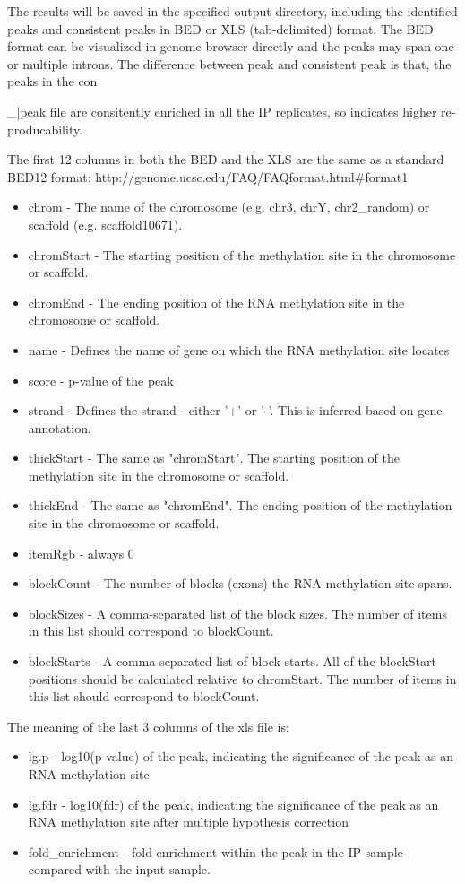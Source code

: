\documentclass[]{article}
\begin{document}
The results will be saved in the specified output directory, including the identified peaks and consistent peaks in BED or XLS (tab-delimited) format. The BED format can be visualized in genome browser directly and the peaks may span one or multiple introns. The difference between peak and consistent peak is that, the peaks in the con{\_|peak file are consitently enriched in all the IP replicates, so indicates higher re-producability.

The first 12 columns in both the BED and the XLS are the same as a standard BED12 format: http://genome.ucsc.edu/FAQ/FAQformat.html{\#}format1
\begin{itemize}
  \item chrom - The name of the chromosome (e.g. chr3, chrY, chr2{\_}random) or scaffold (e.g. scaffold10671). 
  \item chromStart - The starting position of the methylation site in the chromosome or scaffold. 
  \item chromEnd - The ending position of the RNA methylation site in the chromosome or scaffold.
  \item name - Defines the name of gene on which the RNA methylation site locates
  \item score - p-value of the peak
  \item strand - Defines the strand - either '+' or '-'. This is inferred based on gene annotation.
  \item thickStart - The same as "chromStart". The starting position of the methylation site in the chromosome or scaffold. 
  \item thickEnd - The same as "chromEnd". The ending position of the methylation site in the chromosome or scaffold.
  \item itemRgb - always 0
  \item blockCount - The number of blocks (exons) the RNA methylation site spans. 
  \item blockSizes - A comma-separated list of the block sizes. The number of items in this list should correspond to blockCount.
  \item blockStarts - A comma-separated list of block starts. All of the blockStart positions should be calculated relative to chromStart. The number of items in this list should correspond to blockCount. 
\end{itemize}

The meaning of the last 3 columns of the xls file is:

\begin{itemize}
  \item lg.p - log10(p-value) of the peak, indicating the significance of the peak as an RNA methylation site
  \item lg.fdr - log10(fdr) of the peak, indicating the significance of the peak as an RNA methylation site after multiple hypothesis correction 
  \item fold{\_}enrichment - fold enrichment within the peak in the IP sample compared with the input sample.
\end{itemize}

}
\end{document}
